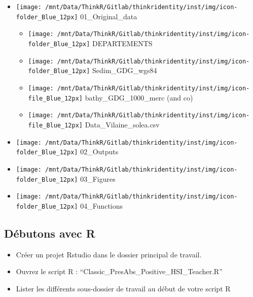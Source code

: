\documentclass[french,a4paper]{article}
\providecommand{\tightlist}{%
  \setlength{\itemsep}{0pt}\setlength{\parskip}{0pt}}
\begin{document}
\begin{itemize}
\tightlist
\item
  \texttt{[image: /mnt/Data/ThinkR/Gitlab/thinkridentity/inst/img/icon-folder\_Blue\_12px]} 01\_Original\_data

  \begin{itemize}
  \tightlist
  \item
    \texttt{[image: /mnt/Data/ThinkR/Gitlab/thinkridentity/inst/img/icon-folder\_Blue\_12px]} DEPARTEMENTS
  \item
    \texttt{[image: /mnt/Data/ThinkR/Gitlab/thinkridentity/inst/img/icon-folder\_Blue\_12px]} Sedim\_GDG\_wgs84
  \item
    \texttt{[image: /mnt/Data/ThinkR/Gitlab/thinkridentity/inst/img/icon-file\_Blue\_12px]} bathy\_GDG\_1000\_merc (and co)
  \item
    \texttt{[image: /mnt/Data/ThinkR/Gitlab/thinkridentity/inst/img/icon-file\_Blue\_12px]} Data\_Vilaine\_solea.csv
  \end{itemize}
\item
  \texttt{[image: /mnt/Data/ThinkR/Gitlab/thinkridentity/inst/img/icon-folder\_Blue\_12px]} 02\_Outputs
\item
  \texttt{[image: /mnt/Data/ThinkR/Gitlab/thinkridentity/inst/img/icon-folder\_Blue\_12px]} 03\_Figures
\item
  \texttt{[image: /mnt/Data/ThinkR/Gitlab/thinkridentity/inst/img/icon-folder\_Blue\_12px]} 04\_Functions
\end{itemize}

\hypertarget{debutons-avec-r}{%
\subsection{Débutons avec R}\label{debutons-avec-r}}

\begin{itemize}
\tightlist
\item
  Créer un projet Rstudio dans le dossier principal de travail.
\item
  Ouvrez le script R : ``Classic\_PresAbs\_Positive\_HSI\_Teacher.R''
\item
  Lister les différents sous-dossier de travail au début de votre script R
\end{itemize}
\end{document}
